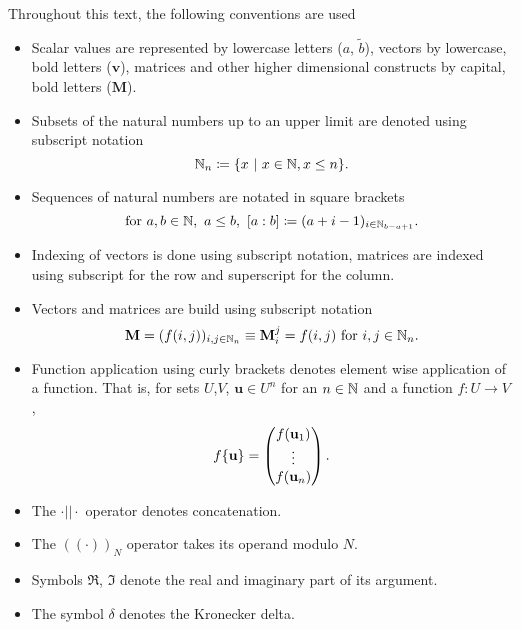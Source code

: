 Throughout this text, the following conventions are used
\begin{itemize}
	\item Scalar values are represented by lowercase letters ($a$, $\tilde b$), vectors by lowercase, bold letters ($\mathbf v$), matrices and other higher dimensional constructs by capital, bold letters ($\mathbf M$).
	\item Subsets of the natural numbers up to an upper limit are denoted using subscript notation 
		\[
			\mathbb{N}_n \coloneqq \{ x \ |\ x \in \mathbb{N}, x \le n\} \text.
		\]
	\item Sequences of natural numbers are notated in square brackets
		\[
			\text{for } a,b \in \mathbb{N},\ a \le b,\ [a:b] \coloneqq (a+i-1)_{i \in \mathbb{N}_{b-a+1}} \text.
		\]
	\item Indexing of vectors is done using subscript notation, matrices are indexed using subscript for the row and superscript for the column.
	\item Vectors and matrices are build using subscript notation
		\[
			\mathbf M = (f(i,j))_{i,j \in \mathbb{N}_n} \equiv \mathbf M_i^j = f(i,j) \text{ for } i,j \in \mathbb{N}_n \text.
		\]
	\item Function application using curly brackets denotes element wise application of a function.
		That is, for sets $U$,$V$, $\mathbf u \in U^n$ for an $n \in \mathbb{N}$ and a function $f: U \to V$, 
		\[
			f\{\mathbf u\} = \begin{pmatrix}
				f(\mathbf u_1) \\ \vdots \\ f(\mathbf u_n)
			\end{pmatrix} \text.
		\]
	\item The $\cdot||\cdot$ operator denotes concatenation.
	\item The $((\cdot))_N$ operator takes its operand modulo $N$.
	\item Symbols $\Re$, $\Im$ denote the real and imaginary part of its argument.
	\item The symbol $\delta$ denotes the Kronecker delta.
\end{itemize}